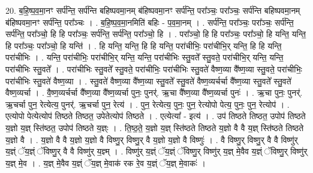 \documentclass[17pt]{extarticle}
\begin{document}
20. ब॒हि॒ष्प॒व॒मा॒नꣳ सर्प॑न्ति॒ सर्प॑न्ति बहिष्पवमा॒नम् ब॑हिष्पवमा॒नꣳ सर्प॑न्ति॒ परा᳚ञ्चः॒ परा᳚ञ्चः॒ सर्प॑न्ति बहिष्पवमा॒नम् ब॑हिष्पवमा॒नꣳ सर्प॑न्ति॒ परा᳚ञ्चः । . ब॒हि॒ष्प॒व॒मा॒नमिति॑ बहिः - प॒व॒मा॒नम् । . सर्प॑न्ति॒ परा᳚ञ्चः॒ परा᳚ञ्चः॒ सर्प॑न्ति॒ सर्प॑न्ति॒ परा᳚ञ्चो॒ हि हि परा᳚ञ्चः॒ सर्प॑न्ति॒ सर्प॑न्ति॒ परा᳚ञ्चो॒ हि । . परा᳚ञ्चो॒ हि हि परा᳚ञ्चः॒ परा᳚ञ्चो॒ हि यन्ति॒ यन्ति॒ हि परा᳚ञ्चः॒ परा᳚ञ्चो॒ हि यन्ति॑ । . हि यन्ति॒ यन्ति॒ हि हि यन्ति॒ परा॑चीभिः॒ परा॑चीभि॒र् यन्ति॒ हि हि यन्ति॒ परा॑चीभिः । . यन्ति॒ परा॑चीभिः॒ परा॑चीभि॒र् यन्ति॒ यन्ति॒ परा॑चीभिः स्तु॒वते᳚ स्तु॒वते॒ परा॑चीभि॒र् यन्ति॒ यन्ति॒ परा॑चीभिः स्तु॒वते᳚ । . परा॑चीभिः स्तु॒वते᳚ स्तु॒वते॒ परा॑चीभिः॒ परा॑चीभिः स्तु॒वते॑ वैष्ण॒व्या वै᳚ष्ण॒व्या स्तु॒वते॒ परा॑चीभिः॒ परा॑चीभिः स्तु॒वते॑ वैष्ण॒व्या । . स्तु॒वते॑ वैष्ण॒व्या वै᳚ष्ण॒व्या स्तु॒वते᳚ स्तु॒वते॑ वैष्ण॒व्यर्चर्चा वै᳚ष्ण॒व्या स्तु॒वते᳚ स्तु॒वते॑ वैष्ण॒व्यर्चा । . वै॒ष्ण॒व्यर्चर्चा वै᳚ष्ण॒व्या वै᳚ष्ण॒व्यर्चा पुनः॒ पुनर्॑. ऋ॒चा वै᳚ष्ण॒व्या वै᳚ष्ण॒व्यर्चा पुनः॑ । . ऋ॒चा पुनः॒ पुनर्॑. ऋ॒चर्चा पुन॒ रेत्येत्य॒ पुनर्॑. ऋ॒चर्चा पुन॒ रेत्य॑ । . पुन॒ रेत्येत्य॒ पुनः॒ पुन॒ रेत्योपो पेत्य॒ पुनः॒ पुन॒ रेत्योप॑ । . एत्योपो पेत्येत्योप॑ तिष्ठते तिष्ठत॒ उपेतेत्योप॑ तिष्ठते । . एत्येत्या᳚ - इत्य॑ । . उप॑ तिष्ठते तिष्ठत॒ उपोप॑ तिष्ठते य॒ज्ञो य॒ज्ञ् स्ति॑ष्ठत॒ उपोप॑ तिष्ठते य॒ज्ञ्ः । . ति॒ष्ठ॒ते॒ य॒ज्ञो य॒ज्ञ् स्ति॑ष्ठते तिष्ठते य॒ज्ञो वै वै य॒ज्ञ् स्ति॑ष्ठते तिष्ठते य॒ज्ञो वै । . य॒ज्ञो वै वै य॒ज्ञो य॒ज्ञो वै विष्णु॒र् विष्णु॒र् वै य॒ज्ञो य॒ज्ञो वै विष्णुः॑ । . वै विष्णु॒र् विष्णु॒र् वै वै विष्णु॑र् य॒ज्ञ्ं ॅय॒ज्ञ्ं ॅविष्णु॒र् वै वै विष्णु॑र् य॒ज्ञ्म् । . विष्णु॑र् य॒ज्ञ्ं ॅय॒ज्ञ्ं ॅविष्णु॒र् विष्णु॑र् य॒ज्ञ् मे॒वैव य॒ज्ञ्ं ॅविष्णु॒र् विष्णु॑र् य॒ज्ञ् मे॒व । . य॒ज्ञ् मे॒वैव य॒ज्ञ्ं ॅय॒ज्ञ् मे॒वाक॑ रक रे॒व य॒ज्ञ्ं ॅय॒ज्ञ् मे॒वाकः॑ । \newline
\end{document}
